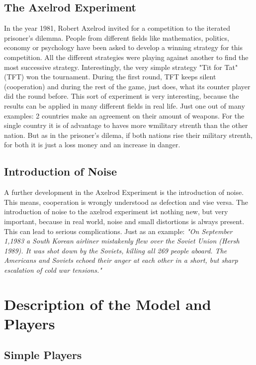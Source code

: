 \documentclass[11pt,twoside]{article}
\begin{document}
\subsection{The Axelrod Experiment}
In the year 1981, Robert Axelrod invited for a competition to the iterated prisoner's dilemma. People from different fields like mathematics, politics, economy or psychology have been asked to develop a winning strategy for this competition. All the different strategies were playing against another to find the most successive strategy. Interestingly, the very simple strategy "Tit for Tat" (TFT) won the tournament. During the first round, TFT keeps silent (cooperation) and during the rest of the game, just does, what its counter player did the round before.
This sort of experiment is very interesting, because the results can be applied in many different fields in real life. Just one out of many examples: 2 countries make an agreement on their amount of weapons. For the single country it is of advantage to haves more wmilitary strenth than the other nation. But as in the prisoner's dilema, if both nations rise their military strenth, for both it is just a loss money and an increase in danger. \cite{axelrod}

\subsection{Introduction of Noise}
A further development in the Axelrod Experiment is the introduction of noise. This means, cooperation is wrongly understood as defection and vise versa. The introduction of noise to the axelrod experiment ist nothing new, but very important, because in real world, noise and small distortions is always present. This can lead to serious complications. Just as an example: \textit{"On September 1,1983 a South Korean airliner mistakenly
flew over the Soviet Union (Hersh 1989). It was shot down by the Soviets, killing all 269
people aboard. The Americans and Soviets echoed their anger at each other in a short,
but sharp escalation of cold war tensions."}\cite{wu}

\clearpage
\section{Description of the Model and Players}

\subsection{Simple Players}
\end{document}

